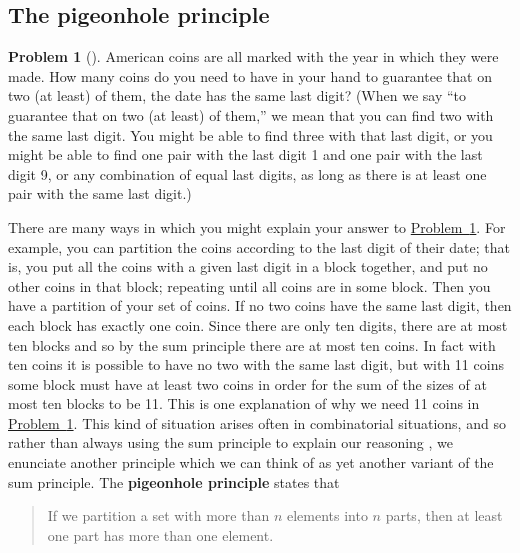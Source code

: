 \documentclass[10pt,]{book}
\newcommand{\terminology}[1]{\textbf{#1}}
\theoremstyle{plain}
\theoremstyle{definition}
\newtheorem{activity}[project]{Problem}
\theoremstyle{definition}
\numberwithin{equation}{chapter}
\begin{document}
\subsection[{The pigeonhole principle}]{The pigeonhole principle}\label{subsection-9}
\begin{activity}[] \label{elevencoins}
\hypertarget{p-366}{}%
American coins are all marked with the year in which they were made. How many coins do you need to have in your hand to guarantee that on two (at least) of them, the date has the same last digit? (When we say ``to guarantee that on two (at least) of them,\textellipsis{}'' we mean that you can find two with the same last digit. You might be able to find three with that last digit, or you might be able to find one pair with the last digit 1 and one pair with the last digit 9, or any combination of equal last digits, as long as there is at least one pair with the same last digit.)%
\end{activity}
\hypertarget{p-368}{}%
There are many ways in which you might explain your answer to \hyperref[elevencoins]{Problem~\ref{elevencoins}}. For example, you can partition the coins according to the last digit of their date; that is, you put all the coins with a given last digit in a block together, and put no other coins in that block; repeating until all coins are in some block. Then you have a partition of your set of coins. If no two coins have the same last digit, then each block has exactly one coin. Since there are only ten digits, there are at most ten blocks and so by the sum principle there are at most ten coins. In fact with ten coins it is possible to have no two with the same last digit, but with 11 coins some block must have at least two coins in order for the sum of the sizes of at most ten blocks to be 11. This is one explanation of why we need 11 coins in \hyperref[elevencoins]{Problem~\ref{elevencoins}}. This kind of situation arises often in combinatorial situations, and so rather than always using the sum principle to explain our reasoning , we enunciate another principle which we can think of as yet another variant of the sum principle. The \terminology{pigeonhole principle} states that%
\begin{quote}\hypertarget{blockquote-7}{}
\hypertarget{p-369}{}%
If we partition a set with more than \(n\) elements into \(n\) parts, then at least one part has more than one element.%
\end{quote}
\hypertarget{p-370}{}%
\end{document}
